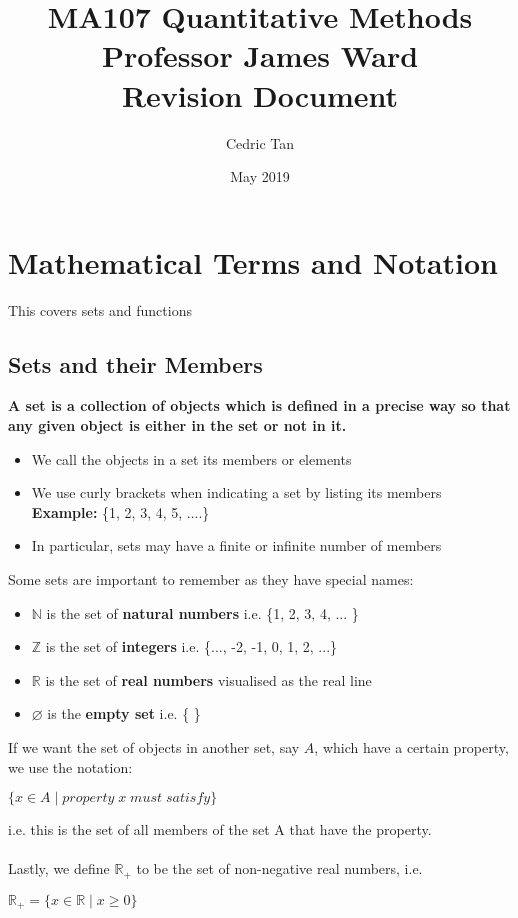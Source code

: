 \documentclass[12pt, letterpaper]{article}
\title{
	{MA107 Quantitative Methods}\\
	{\large{Professor James Ward}}\\
	{\large{Revision Document}}
}
\author{Cedric Tan}
\date{May 2019}
\begin{document}
\maketitle
{}

\newpage
\tableofcontents
\newpage

\section{Mathematical Terms and Notation}
This covers sets and functions
\subsection{Sets and their Members}
\textbf{A set is a collection of objects which is defined in a precise way so that any given object is either in the set or not in it.}
\begin{itemize}
	\item We call the objects in a set its members or elements
	\item We use curly brackets when indicating a set by listing its members\\
		\textbf{Example:} \{1, 2, 3, 4, 5, ....\}
	\item In particular, sets may have a finite or infinite number of members
\end{itemize}
Some sets are important to remember as they have special names:
\begin{itemize}
	\item $\mathbb{N}$ is the set of \textbf{natural numbers} i.e. \{1, 2, 3, 4, ... \}
	\item $\mathbb{Z}$ is the set of \textbf{integers} i.e. \{..., -2, -1, 0, 1, 2, ...\}
	\item $\mathbb{R}$ is the set of \textbf{real numbers} visualised as the real line
	\item $\varnothing$ is the \textbf{empty set} i.e. \{ \}
\end{itemize}
If we want the set of objects in another set, say $A$, which have a certain property, we use the notation:
\begin{center}
	$\{ x \in A\;|\; property\;x\;must\;satisfy\}$
\end{center}
i.e. this is the set of all members of the set A that have the property.
\\\\
Lastly, we define $\mathbb{R_+}$ to be the set of non-negative real numbers, i.e.
\begin{center}
	$\mathbb{R_+} = \{x \in \mathbb{R}\; | \; x \geq 0 \}$
\end{center}
\end{document}
